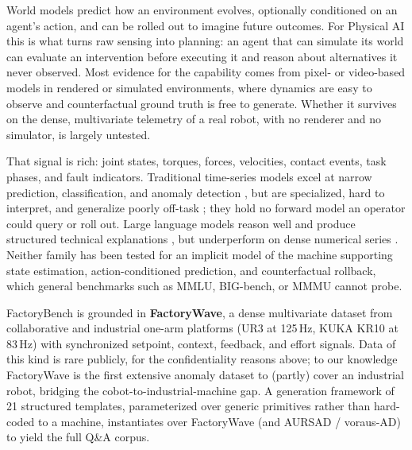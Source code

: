 World models predict how an environment evolves, optionally conditioned on an agent's action, and can be rolled out to imagine future outcomes. For Physical AI this is what turns raw sensing into planning: an agent that can simulate its world can evaluate an intervention before executing it and reason about alternatives it never observed. Most evidence for the capability comes from pixel- or video-based models in rendered or simulated environments, where dynamics are easy to observe and counterfactual ground truth is free to generate. Whether it survives on the dense, multivariate telemetry of a real robot, with no renderer and no simulator, is largely untested.

That signal is rich: joint states, torques, forces, velocities, contact events, task phases, and fault indicators. Traditional time-series models excel at narrow prediction, classification, and anomaly detection \cite{zhou2021informer,su2019omni,audibert2020usad}, but are specialized, hard to interpret, and generalize poorly off-task \cite{chalapathy2019survey,lavin2015numenta,zeng2023transformers}; they hold no forward model an operator could query or roll out. Large language models reason well and produce structured technical explanations \cite{wei2022chain,yao2023tree}, but underperform on dense numerical series \cite{gruver2023llmtime,jin2024timellm}. Neither family has been tested for an implicit model of the machine supporting state estimation, action-conditioned prediction, and counterfactual rollback, which general benchmarks such as MMLU, BIG-bench, or MMMU \cite{hendrycks2021mmlu,srivastava2023bigbench,yue2024mmmu} cannot probe.



FactoryBench is grounded in \textbf{FactoryWave}, a dense multivariate dataset from collaborative and industrial one-arm platforms (UR3 at 125\,Hz, KUKA KR10 at 83\,Hz) with synchronized setpoint, context, feedback, and effort signals. Data of this kind is rare publicly, for the confidentiality reasons above; to our knowledge FactoryWave is the first extensive anomaly dataset to (partly) cover an industrial robot, bridging the cobot-to-industrial-machine gap. A generation framework of 21 structured templates, parameterized over generic primitives rather than hard-coded to a machine, instantiates over FactoryWave (and AURSAD / voraus-AD) to yield the full Q\&A corpus.

\newcommand{\workshoprelatedworknote}{World models for physical dynamics are most developed in the visual and simulated-physics regime (e.g., CLEVR/CLEVRER-style compositional and causal video QA); FactoryBench instead grounds the same association--intervention--counterfactual hierarchy in real, dense, multivariate telemetry from physical robots under closed-loop control, where the dynamics are governed by controller and mechanical constraints rather than rendered pixels.}

